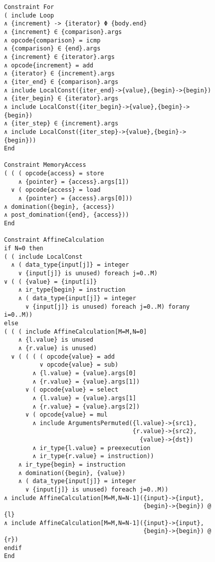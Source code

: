 \begin{figure}[p]
\begin{lstlisting}[language=IDL,basicstyle=\linespread{0.8}\small\ttfamily,
                   firstnumber=91]
Constraint For
( include Loop
∧ {increment} -> {iterator} Φ {body.end}
∧ {increment} ∈ {comparison}.args
∧ opcode{comparison} = icmp
∧ {comparison} ∈ {end}.args
∧ {increment} ∈ {iterator}.args
∧ opcode{increment} = add
∧ {iterator} ∈ {increment}.args
∧ {iter_end} ∈ {comparison}.args
∧ include LocalConst({iter_end}->{value},{begin}->{begin})
∧ {iter_begin} ∈ {iterator}.args
∧ include LocalConst({iter_begin}->{value},{begin}->{begin})
∧ {iter_step} ∈ {increment}.args
∧ include LocalConst({iter_step}->{value},{begin}->{begin}))
End

Constraint MemoryAccess
( ( ( opcode{access} = store
    ∧ {pointer} = {access}.args[1])
  ∨ ( opcode{access} = load
    ∧ {pointer} = {access}.args[0]))
∧ domination({begin}, {access})
∧ post_domination({end}, {access}))
End

Constraint AffineCalculation
if N=0 then
( ( include LocalConst
  ∧ ( data_type{input[j]} = integer
    ∨ {input[j]} is unused) foreach j=0..M)
∨ ( ( {value} = {input[i]}
    ∧ ir_type{begin} = instruction
    ∧ ( data_type{input[j]} = integer
      ∨ {input[j]} is unused) foreach j=0..M) forany i=0..M))
else
( ( ( include AffineCalculation[M=M,N=0]
    ∧ {l.value} is unused
    ∧ {r.value} is unused)
  ∨ ( ( ( ( opcode{value} = add
          ∨ opcode{value} = sub)
        ∧ {l.value} = {value}.args[0]
        ∧ {r.value} = {value}.args[1])
      ∨ ( opcode{value} = select
        ∧ {l.value} = {value}.args[1]
        ∧ {r.value} = {value}.args[2])
      ∨ ( opcode{value} = mul
        ∧ include ArgumentsPermuted({l.value}->{src1},
                                    {r.value}->{src2},
                                      {value}->{dst})
        ∧ ir_type{l.value} = preexecution
        ∧ ir_type{r.value} = instruction))
    ∧ ir_type{begin} = instruction
    ∧ domination({begin}, {value})
    ∧ ( data_type{input[j]} = integer
      ∨ {input[j]} is unused) foreach j=0..M))
∧ include AffineCalculation[M=M,N=N-1]({input}->{input},
                                       {begin}->{begin}) @ {l}
∧ include AffineCalculation[M=M,N=N-1]({input}->{input},
                                       {begin}->{begin}) @ {r})
endif
End
\end{lstlisting}
\end{figure}
